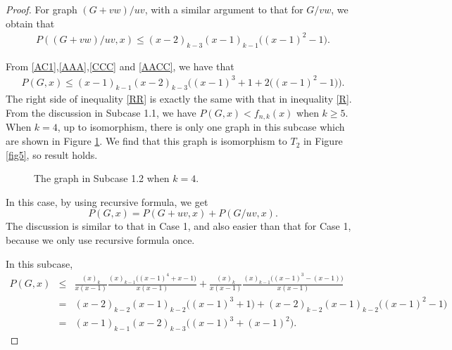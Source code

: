 \documentclass[12pt]{article}
\theoremstyle{definition}
\begin{document}
\begin{proof}
For graph $(G+vw)/uv$, with a similar argument to that for $G/vw$, we obtain that
\begin{eqnarray}\label{AACC}P((G+vw)/uv,x)\leq (x-2)_{k-3}(x-1)_{k-1}\big((x-1)^2-1\big).\end{eqnarray}

From \eqref{AC1},\eqref{AAA},\eqref{CCC} and \eqref{AACC}, we have that
\begin{eqnarray}\label{RR}P(G,x)\leq(x-1)_{k-1}(x-2)_{k-3}\Big((x-1)^3+1+2\big((x-1)^2-1\big)\Big).
\end{eqnarray}
The right side of inequality \eqref{RR} is exactly the same with that in inequality \eqref{R}. From the discussion in Subcase 1.1, we have $P(G,x)<f_{n,k}(x)$ when $k\geq 5$. When $k=4$, up to isomorphism, there is only one graph in this subcase which are shown in Figure \ref{fig6}. We find that this graph is isomorphism to $T_2$ in Figure \ref{fig5}, so result holds.


\begin{figure}[h!]
\begin{center}
\caption{The graph in Subcase 1.2 when $k=4$.}
\label{fig6}
\end{center}
\end{figure}



In this case, by using recursive formula, we get $$P(G,x)=P(G+uv,x)+P(G/uv,x).$$  The discussion is similar to that in Case 1, and  also easier than that for Case 1, because we only use recursive formula once.


In this subcase,
\begin{eqnarray*}P(G,x)&\leq &\frac{(x)_{k}}{x(x-1)}\frac{(x)_{k-1}\big((x-1)^4+x-1\big)}{x(x-1)}+\frac{(x)_{k}}{x(x-1)}\frac{(x)_{k-1}\big((x-1)^3-(x-1)\big)}{x(x-1)}\\
&=&(x-2)_{k-2}(x-1)_{k-2}\big((x-1)^3+1\big)+(x-2)_{k-2}(x-1)_{k-2}\big((x-1)^2-1\big)\\
&=&(x-1)_{k-1}(x-2)_{k-3}\big((x-1)^3+(x-1)^2\big).
\end{eqnarray*}



\end{proof}
\end{document}
